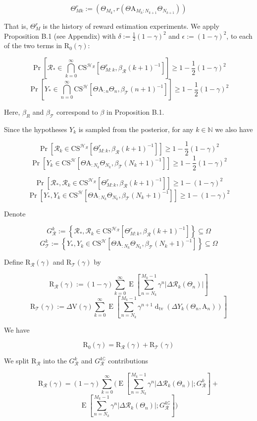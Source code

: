 \documentclass[a4paper]{article}
\newcommand{\AP}[1]{\left(#1\right)}
\newcommand{\AB}[1]{\left[#1\right]}
\newcommand{\AC}[1]{\left\{#1\right\}}
\newcommand{\Abs}[1]{\left\vert #1 \right\vert}
\newcommand{\Pb}[1]{\operatorname{Pr}\AB{#1}}
\newcommand{\E}[1]{\operatorname{E}\AB{#1}}
\newcommand{\Dtva}[1]{\operatorname{d}_{\text{tv}}\AP{#1}}
\newcommand{\Nats}{\mathbb{N}}
\newcommand{\R}{\mathcal{R}}
\newcommand{\T}{\mathcal{T}}
\newcommand{\Hy}{\mathcal{H}}
\newcommand{\V}{\mathrm{V}}
\newcommand{\Reg}{\mathrm{R}}
\newcommand{\THy}{Y_*}
\newcommand{\SHy}{Y}
\newcommand{\AT}{\mathrm{A}}
\newcommand{\ET}{N}
\newcommand{\IT}{M}
\newcommand{\CSE}{G}
\newcommand{\CS}{\mathrm{CS}}
\begin{document}
$$\Theta_{Mk}^r:=\AP{\Theta_{M_k},r\AP{\Theta\AT_{M_k:N_{k+1}}\Theta_{N_{k+1}}}}$$

That is, $\Theta_M^r$ is the history of reward estimation experiments. We apply Proposition B.1 (see Appendix) with $\delta:=\frac{1}{2}(1-\gamma)^2$ and $\epsilon:=(1-\gamma)^2$, to each of the two terms in $\Reg_0(\gamma)$:

$$\Pb{\R_*\in\bigcap_{k=0}^\infty\CS^{\Hy_\R}\AB{\Theta_{M:k}^{r},\beta_\R(k+1)^{-1}}} \geq 1-\frac{1}{2}(1-\gamma)^2$$
$$\Pb{\SHy_*\in\bigcap_{n=0}^\infty\CS^{\Hy}\AB{\Theta\AT_{:n}\Theta_n,\beta_\T(n+1)^{-1}}} \geq 1-\frac{1}{2}(1-\gamma)^2$$

Here, $\beta_R$ and $\beta_\T$ correspond to $\beta$ in Proposition B.1.

Since the hypotheses $\SHy_k$ is sampled from the posterior, for any $k\in\Nats$ we also have

$$\Pb{\R_k\in\CS^{\Hy_\R}\AB{\Theta_{M:k}^{r},\beta_\R(k+1)^{-1}}} \geq 1-\frac{1}{2}(1-\gamma)^2$$
$$\Pb{\SHy_{k}\in\CS^\Hy\AB{\Theta\AT_{:N_k}\Theta_{N_k},\beta_\T\AP{N_k+1}^{-1}}} \geq 1-\frac{1}{2}(1-\gamma)^2$$

$$\Pb{\R_*,\R_k\in\CS^{\Hy_\R}\AB{\Theta_{M:k}^{r},\beta_\R(k+1)^{-1}}} \geq 1-(1-\gamma)^2$$
$$\Pb{\THy,\SHy_{k}\in\CS^\Hy\AB{\Theta\AT_{:N_k}\Theta_{N_k},\beta_\T\AP{N_k+1}^{-1}}} \geq 1-(1-\gamma)^2$$

Denote

$$\CSE_\R^k:=\AC{\R_*,\R_k\in\CS^{\Hy_\R}\AB{\Theta_{M:k}^{r},\beta_\R(k+1)^{-1}}}\subseteq\Omega$$
$$\CSE_\T^k:=\AC{\THy,\SHy_{k}\in\CS^\Hy\AB{\Theta\AT_{:N_k}\Theta_{N_k},\beta_\T\AP{N_k+1}^{-1}}}\subseteq\Omega$$

Define $\Reg_{\R}(\gamma)$ and $\Reg_{\T}(\gamma)$ by

$$\Reg_{\R}(\gamma):=(1-\gamma)\sum_{k=0}^\infty\E{\sum_{n=\ET_k}^{\IT_k-1}\gamma^{n}\Abs{\Delta\R_k\AP{\Theta_n}}}$$
$$\Reg_{\T}(\gamma):=\Delta\V(\gamma)\sum_{k=0}^\infty\E{\sum_{n=\ET_k}^{\IT_k-1}\gamma^{n+1}\Dtva{\Delta\SHy_k\AP{\Theta_n,\AT_n}}}$$

We have

$$\Reg_0(\gamma)=\Reg_{\R}(\gamma)+\Reg_{\T}(\gamma)$$

We split $\Reg_{\R}$ into the $\CSE_\R^k$ and $\CSE_\R^{k\complement}$ contributions

$$\Reg_{\R}(\gamma)=(1-\gamma)\sum_{k=0}^\infty\Bigg(\E{\sum_{n=\ET_k}^{\IT_k-1}\gamma^{n}\Abs{\Delta\R_k\AP{\Theta_n}};\CSE_\R^k}+$$
$$\E{\sum_{n=\ET_k}^{\IT_k-1}\gamma^{n}\Abs{\Delta\R_k\AP{\Theta_n}};\CSE_\R^{k\complement}}\Bigg)$$
\end{document}
